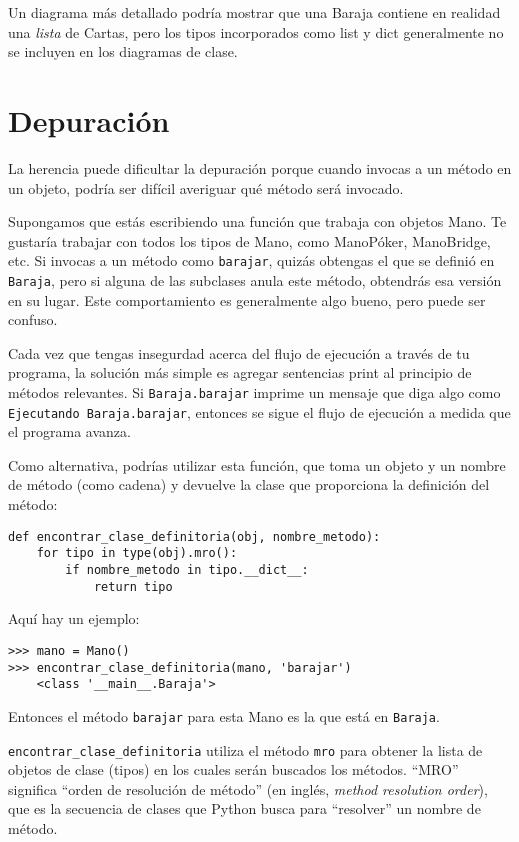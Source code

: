 \documentclass[10pt]{book}
\begin{document}
Un diagrama más detallado podría mostrar que una Baraja contiene
en realidad una {\em lista} de Cartas, pero los tipos incorporados
como list y dict generalmente no se incluyen en los diagramas de clase.


\section{Depuración}

La herencia puede dificultar la depuración porque cuando invocas a un
método en un objeto, podría ser difícil averiguar qué método
será invocado.

Supongamos que estás escribiendo una función que trabaja con objetos Mano.
Te gustaría trabajar con todos los tipos de Mano, como
ManoPóker, ManoBridge, etc.  Si invocas a un método como
{\tt barajar}, quizás obtengas el que se definió en {\tt Baraja},
pero si alguna de las subclases anula este método,
obtendrás esa versión en su lugar.  Este comportamiento es generalmente algo
bueno, pero puede ser confuso.

Cada vez que tengas insegurdad acerca del flujo de ejecución a través de tu
programa, la solución más simple es agregar sentencias print al
principio de métodos relevantes.  Si {\tt Baraja.barajar} imprime un
mensaje que diga algo como {\tt Ejecutando Baraja.barajar}, entonces
se sigue el flujo de ejecución a medida que el programa avanza.

Como alternativa, podrías utilizar esta función, que toma un
objeto y un nombre de método (como cadena) y devuelve la clase que
proporciona la definición del método:

\begin{verbatim}
def encontrar_clase_definitoria(obj, nombre_metodo):
    for tipo in type(obj).mro():
        if nombre_metodo in tipo.__dict__:
            return tipo
\end{verbatim}
%
Aquí hay un ejemplo:

\begin{verbatim}
>>> mano = Mano()
>>> encontrar_clase_definitoria(mano, 'barajar')
    <class '__main__.Baraja'>
\end{verbatim}
%
Entonces el método {\tt barajar} para esta Mano es la que está en {\tt Baraja}.

\verb"encontrar_clase_definitoria" utiliza el método {\tt mro} para obtener la lista de
objetos de clase (tipos) en los cuales serán buscados los métodos.  ``MRO''
significa ``orden de resolución de método'' (en inglés, {\em method resolution order}), que es la secuencia de
clases que Python busca para ``resolver'' un nombre de método.
\end{document}
